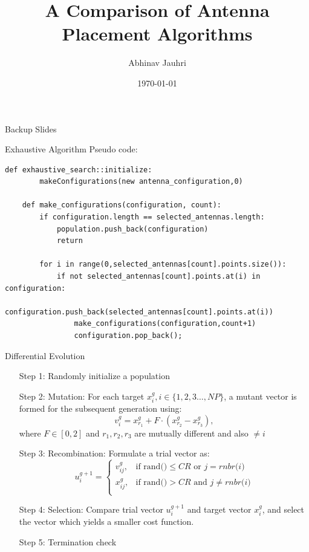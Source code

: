 \documentclass{beamer}
\title{\color{univred} A Comparison of Antenna Placement Algorithms}
\author{Abhinav Jauhri}
\date{\today}
\begin{document}
\begin{frame}
    \color{univred}
    \titlepage
    \begin{center}
        {\tiny Backup Slides}
\end{center}
\end{frame}

\begin{frame}[fragile]{Exhaustive Algorithm}
    Pseudo code: 
    \vspace*{1cm}
    \begin{Verbatim}[fontsize=\tiny]
    def exhaustive_search::initialize: 
        makeConfigurations(new antenna_configuration,0) 

    def make_configurations(configuration, count): 
        if configuration.length == selected_antennas.length: 
            population.push_back(configuration)
            return 

        for i in range(0,selected_antennas[count].points.size()):
            if not selected_antennas[count].points.at(i) in configuration: 
                configuration.push_back(selected_antennas[count].points.at(i))
                make_configurations(configuration,count+1)
                configuration.pop_back();
    \end{Verbatim}
\end{frame}

\begin{frame}{Differential Evolution}
    \begin{enumerate}
        \item [Step 1:] Randomly initialize a population 
        \item [Step 2:] Mutation: For each target $x_i^g, i \in \{1, 2, 3 \ldots, NP\}$, a mutant vector is formed for the subsequent generation using:
            \[v_i^{g} = x_{r_1}^g + F \cdot (x_{r_2}^g - x_{r_3}^g), \]
            where $F \in [0,2]$ and $r_1, r_2, r_3$ are mutually different and also $ \neq i$
        \item [Step 3:] Recombination: Formulate a trial vector as:
    \[u_i^{g+1} = 
        \begin{cases}
            v_{ij}^g, & \text{if rand()} \leq CR \text{ or }j = \textit{rnbr(i)} \\
            x_{ij}^g, & \text{if rand()} > CR \text{ and }j \neq \textit{rnbr(i)} \\
    \end{cases}\]
        \item [Step 4:] Selection: Compare trial vector $u_i^{g+1}$ and target vector $x_i^g$, and select the vector which yields a smaller cost function.\\
        \item [Step 5:] Termination check
    \end{enumerate}
\end{frame}
\end{document}
